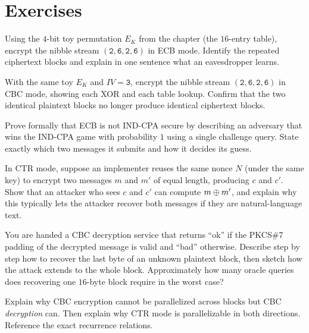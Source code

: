 \section{Exercises}

\begin{exercise}
Using the $4$-bit toy permutation $E_K$ from the chapter (the $16$-entry table), encrypt the nibble stream $(\mathtt{2},\mathtt{6},\mathtt{2},\mathtt{6})$ in ECB mode. Identify the repeated ciphertext blocks and explain in one sentence what an eavesdropper learns.
\end{exercise}

\begin{exercise}
With the same toy $E_K$ and $\mathit{IV} = \mathtt{3}$, encrypt the nibble stream $(\mathtt{2},\mathtt{6},\mathtt{2},\mathtt{6})$ in CBC mode, showing each XOR and each table lookup. Confirm that the two identical plaintext blocks no longer produce identical ciphertext blocks.
\end{exercise}

\begin{exercise}
Prove formally that ECB is not IND-CPA secure by describing an adversary that wins the IND-CPA game with probability $1$ using a single challenge query. State exactly which two messages it submits and how it decides its guess.
\end{exercise}

\begin{exercise}
In CTR mode, suppose an implementer reuses the same nonce $N$ (under the same key) to encrypt two messages $m$ and $m'$ of equal length, producing $c$ and $c'$. Show that an attacker who sees $c$ and $c'$ can compute $m \oplus m'$, and explain why this typically lets the attacker recover both messages if they are natural-language text.
\end{exercise}

\begin{exercise}
You are handed a CBC decryption service that returns ``ok'' if the PKCS\#7 padding of the decrypted message is valid and ``bad'' otherwise. Describe step by step how to recover the last byte of an unknown plaintext block, then sketch how the attack extends to the whole block. Approximately how many oracle queries does recovering one $16$-byte block require in the worst case?
\end{exercise}

\begin{exercise}
Explain why CBC encryption cannot be parallelized across blocks but CBC \emph{decryption} can. Then explain why CTR mode is parallelizable in both directions. Reference the exact recurrence relations.
\end{exercise}

